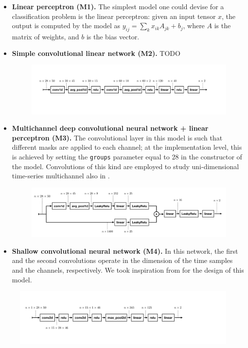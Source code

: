 \documentclass{article}
\begin{document}
\begin{itemize}
\item \textbf{Linear perceptron (M1).} 
The simplest model one could devise for a classification problem is the linear perceptron:  given an input tensor $x$, the output is computed by the model as $y_{ij} = \sum_{k}x_{ik} A_{jk} + b_{j}$, where $A$ is the matrix of weights, and $b$ is the bias vector.

\item \textbf{Simple convolutional linear network (M2).} TODO
\begin{figure}[h]
\centering
\includegraphics[width=\textwidth, clip=true,trim=100 300 295 230]{fig/conv1.pdf}
\end{figure}

\item \textbf{Multichannel deep convolutional neural network + linear perceptron (M3).}
The convolutional layer in this model is such that  different masks are applied to each channel; at the implementation level, this is achieved by setting the \verb|groups| parameter equal to 28 in the constructor of the model. Convolutions of this kind are employed to study  uni-dimensional time-series multichannel also in \cite{zheng2014time}.
\begin{figure}[h!]
\centering
\includegraphics[width=\textwidth, clip=true,trim=30 40 70 50]{fig/conv2.pdf}
\end{figure}

\item \textbf{Shallow convolutional neural network (M4).}
In this network, the first and the second convolutions operate in the dimension of the time samples and the channels, respectively. 
We took inspiration from \cite{schirrmeister2017deep} for the design of this model.
\end{itemize}
\begin{figure}[h!]
\centering
\includegraphics[width=\textwidth, clip=true,trim=80 200 520 200]{fig/conv3.pdf}
\end{figure}
\end{document}
